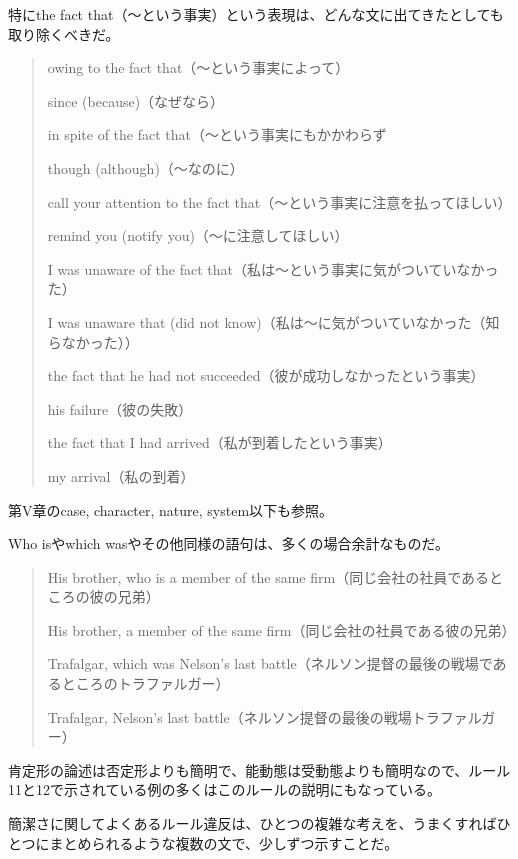 特にthe fact that（～という事実）という表現は、どんな文に出てきたとしても取り除くべきだ。
\begin{quote}
    owing to the fact that（～という事実によって）
    
    since (because)（なぜなら）
    
    in spite of the fact that（～という事実にもかかわらず
    
    though (although)（～なのに）
    
    call your attention to the fact that（～という事実に注意を払ってほしい）
    
    remind you (notify you)（～に注意してほしい）
    
    I was unaware of the fact that（私は～という事実に気がついていなかった）
    
    I was unaware that (did not know)（私は～に気がついていなかった（知らなかった））
    
    the fact that he had not succeeded（彼が成功しなかったという事実）
    
    his failure（彼の失敗）
    
    the fact that I had arrived（私が到着したという事実）
    
    my arrival（私の到着）
\end{quote}
第V章のcase, character, nature, system以下も参照。
\par
Who isやwhich wasやその他同様の語句は、多くの場合余計なものだ。
\begin{quote}
    His brother, who is a member of the same firm（同じ会社の社員であるところの彼の兄弟）
    
    His brother, a member of the same firm（同じ会社の社員である彼の兄弟）
    
    Trafalgar, which was Nelson's last battle（ネルソン提督の最後の戦場であるところのトラファルガー）
    
    Trafalgar, Nelson's last battle（ネルソン提督の最後の戦場トラファルガー）
\end{quote}
肯定形の論述は否定形よりも簡明で、能動態は受動態よりも簡明なので、ルール11と12で示されている例の多くはこのルールの説明にもなっている。
\par
簡潔さに関してよくあるルール違反は、ひとつの複雑な考えを、うまくすればひとつにまとめられるような複数の文で、少しずつ示すことだ。
